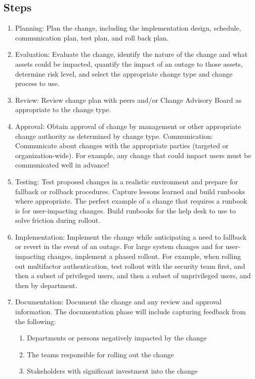 \documentclass[../main.tex]{subfiles}
\begin{document}
\subsection{Steps}
\begin{enumerate}
    \item Planning: Plan the change, including the implementation design, schedule, communication plan, test plan, and roll back plan.
    \item Evaluation: Evaluate the change, identify the nature of the change and what assets could be impacted, quantify the impact of an outage to those assets, determine risk level,
    and select the appropriate change type and change process to use.
    \item Review: Review change plan with peers and/or Change Advisory Board as appropriate to the change type.
    \item Approval: Obtain approval of change by management or other appropriate change authority as determined by change type. Communication: Communicate about changes with the
    appropriate parties (targeted or organization-wide). For example, any change that could impact users must be communicated well in advance!
    \item Testing: Test proposed changes in a realistic environment and prepare for fallback or rollback procedures. Capture lessons learned and build runbooks where appropriate.
    The perfect example of a change that requires a runbook is for user-impacting changes. Build runbooks for the help desk to use to solve friction during rollout.
    \item Implementation: Implement the change while anticipating a need to fallback or revert in the event of an outage. For large system changes and for user-impacting changes,
    implement a phased rollout. For example, when rolling out multifactor authentication, test rollout with the security team first, and then a subset of privileged users,
    and then a subset of unprivileged users, and then by department.
    \item Documentation: Document the change and any review and approval information. The documentation phase will include capturing feedback from the following:
    \begin{enumerate}
        \item Departments or persons negatively impacted by the change
        \item The teams responsible for rolling out the change
        \item Stakeholders with significant investment into the change

\end{enumerate}
\end{enumerate}
\end{document}

